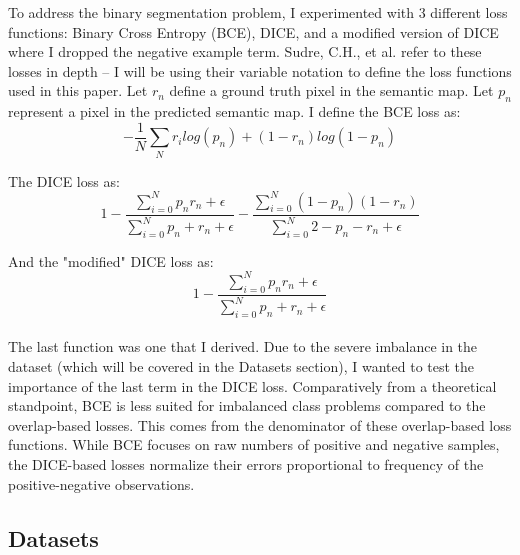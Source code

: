 \documentclass[Location Location Location! : Exploring Image Segmentation Problem In Urban Driving Scenarios]{IEEEtran}
\begin{document}
To address the binary segmentation problem, I experimented with 3 different loss functions: Binary Cross Entropy (BCE), DICE, and a modified version of DICE where I dropped the negative example term. Sudre, C.H., et al. \cite{gen-dice} refer to these losses in depth -- I will be using their variable notation to define the loss functions used in this paper. Let $r_n$ define a ground truth pixel in the semantic map. Let $p_n$ represent a pixel in the predicted semantic map. I define the BCE loss as: \\


\begin{equation}
-\frac{1}{N} \sum_N r_ilog(p_n) + (1 - r_n)log(1 -p_n)
\end{equation}

The DICE loss as:\\


\begin{equation}
1 -\frac{\sum_{i=0}^N p_nr_n + \epsilon}{\sum_{i=0}^N  p_n + r_n + \epsilon} - \frac{\sum_{i=0}^N  (1 - p_n)(1 - r_n)}{\sum_{i=0}^N  2 - p_n - r_n +\epsilon}
\end{equation}

And the "modified" DICE loss as: \\


\begin{equation}
1 -\frac{\sum_{i=0}^N p_nr_n + \epsilon}{\sum_{i=0}^N  p_n + r_n + \epsilon} 
\end{equation}\\

 
The last function was one that I derived. Due to the severe imbalance in the dataset (which will be covered in the Datasets section), I wanted to test the importance of the last term in the DICE loss. Comparatively from a theoretical standpoint, BCE is less suited for imbalanced class problems compared to the overlap-based losses. This comes from the denominator of these overlap-based loss functions. While BCE focuses on raw numbers of positive and negative samples, the DICE-based losses normalize their errors proportional to frequency of the positive-negative observations.    	

\subsection{Datasets}
\end{document}
